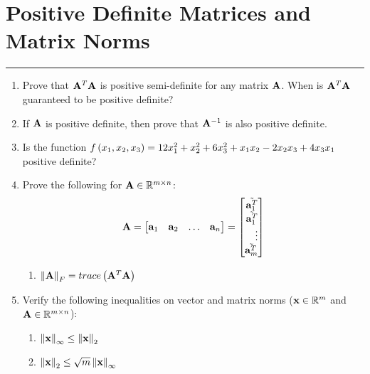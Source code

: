 \documentclass[
10pt, %
a4paper, %
oneside, %
headinclude,footinclude, %
BCOR5mm, %
]{scrartcl}
\def\mf{\ensuremath\mathbf}
\def\mb{\ensuremath\mathbb}
\def\lp{\ensuremath\left(}
\def\rp{\ensuremath\right)}
\def\lv{\ensuremath\left\lvert}
\def\rv{\ensuremath\right\rvert}
\def\lV{\ensuremath\left\lVert}
\def\rV{\ensuremath\right\rVert}
\def\bmx{\ensuremath\begin{bmatrix*}[r]}
\def\emx{\ensuremath\end{bmatrix*}}
\begin{document}
\newpage
\section{Positive Definite Matrices and Matrix Norms}
\hrule
\vspace{0.5cm}

\begin{enumerate}
	\item Prove that $\mf{A}^T\mf{A}$ is positive semi-definite for any matrix $\mf{A}$. When is $\mf{A}^T\mf{A}$ guaranteed to be positive definite? 

    \item If $\mf{A}$ is positive definite, then prove that $\mf{A}^{-1}$ is also positive definite. 

    \item Is the function $f\lp x_1, x_2, x_3\rp = 12 x_1^2 + x_2^2 + 6x_3^2 + x_1x_2 - 2x_2x_3 + 4x_3x_1$ positive definite?  
    
    \item Prove the following for $\mf{A} \in \mb{R}^{m \times n}$:  
    \[ \mf{A} = \bmx \mf{a}_1 & \mf{a}_2 & \ldots & \mf{a}_n\emx = \bmx \tilde{\mf{a}_1^T}\\ \tilde{\mf{a}_1^T} \\ \vdots \\ \tilde{\mf{a}_m^T}\emx \]
    \begin{enumerate}
        \item $\lV\mf{A}\rV_F = trace\lp \mf{A}^T\mf{A}\rp$
    \end{enumerate}


    \item Verify the following inequalities on vector and matrix norms ($\mf{x} \in \mb{R}^m$ and $\mf{A} \in \mb{R}^{m \times n}$):  
    \begin{enumerate}
        \item $\lV\mf{x}\rV_\infty \leq \lV\mf{x}\rV_2$
        \item $\lV\mf{x}\rV_2 \leq \sqrt{m}\lV\mf{x}\rV_\infty$
    \end{enumerate}
\end{enumerate}
\end{document}
